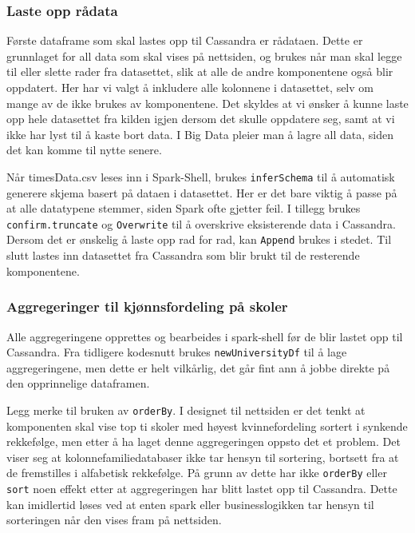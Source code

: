 
\subsubsection{Laste opp rådata}
Første dataframe som skal lastes opp til Cassandra er rådataen. Dette er grunnlaget for all data som skal vises på nettsiden, og brukes når man skal legge til eller slette rader fra datasettet, slik at alle de andre komponentene også blir oppdatert. Her har vi valgt å inkludere alle kolonnene i datasettet, selv om mange av de ikke brukes av komponentene. Det skyldes at vi ønsker å kunne laste opp hele datasettet fra kilden igjen dersom det skulle oppdatere seg, samt at vi ikke har lyst til å kaste bort data. I Big Data pleier man å lagre all data, siden det kan komme til nytte senere.


Når timesData.csv leses inn i Spark-Shell, brukes \lstinline{inferSchema} til å automatisk generere skjema basert på dataen i datasettet. Her er det bare viktig å passe på at alle datatypene stemmer, siden Spark ofte gjetter feil. I tillegg brukes \lstinline{confirm.truncate} og \lstinline{Overwrite} til å overskrive eksisterende data i Cassandra. Dersom det er ønskelig å laste opp rad for rad, kan \lstinline{Append} brukes i stedet. Til slutt lastes inn datasettet fra Cassandra som blir brukt til de resterende komponentene.

\subsubsection{Aggregeringer til kjønnsfordeling på skoler}
Alle aggregeringene opprettes og bearbeides i spark-shell før de blir lastet opp til Cassandra. Fra tidligere kodesnutt brukes \lstinline{newUniversityDf} til å lage aggregeringene, men dette er helt vilkårlig, det går fint ann å jobbe direkte på den opprinnelige dataframen.

Legg merke til bruken av \lstinline{orderBy}. I designet til nettsiden er det tenkt at komponenten skal vise top ti skoler med høyest kvinnefordeling sortert i synkende rekkefølge, men etter å ha laget denne aggregeringen oppsto det et problem. Det viser seg at kolonnefamiliedatabaser ikke tar hensyn til sortering, bortsett fra at de fremstilles i alfabetisk rekkefølge. På grunn av dette har ikke \lstinline{orderBy} eller \lstinline{sort} noen effekt etter at aggregeringen har blitt lastet opp til Cassandra. Dette kan imidlertid løses ved at enten spark eller businesslogikken tar hensyn til sorteringen når den vises fram på nettsiden.

